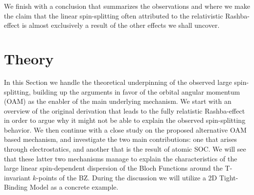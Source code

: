 We finish with a conclusion that summarizes the observations and where we make the claim that the linear spin-splitting often attributed to the relativistic Rashba-effect is almost exclusively a result of the other effects we shall uncover.

\section{Theory \label{sec:Rashba_Theory}}
In this Section we handle the theoretical underpinning of the observed large spin-splitting, building up the arguments in favor of the orbital angular momentum (OAM) as the enabler of the main underlying mechanism.
We start with an overview of the original derivation that leads to the fully relatistic Rashba-effect in order to argue why it might not be able to explain the observed spin-splitting behavior.
We then continue with a close study on the proposed alternative OAM based mechanism, and investigate the two main contributions: one that arises through electrostatics, and another that is the result of atomic SOC.
We will see that these latter two mechanisms manage to explain the characteristics of the large linear spin-dependent dispersion of the Bloch Functions around the T-invariant $k$-points of the BZ.
During the discussion we will utilize a 2D Tight-Binding Model as a concrete example.

